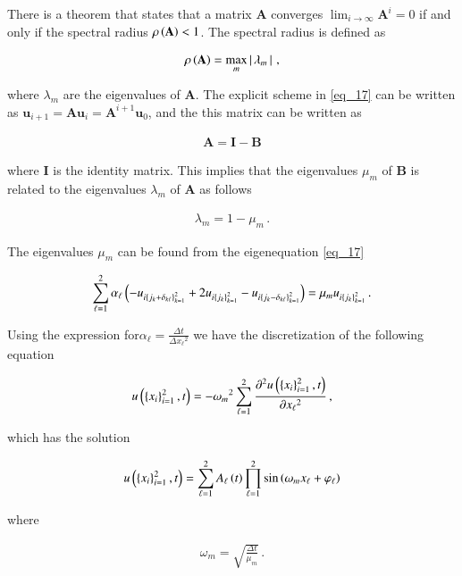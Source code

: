 \documentclass[11pt,english,a4paper]{article}
\begin{document}
\begin{flushleft}
There is a theorem that states that a matrix $\textbf{A}$ converges $\lim_{i\to\infty} \textbf{A}^i = 0$ if and only if the spectral radius $\rho\left({\textbf{A}}\right) < 1$. The spectral radius is defined as

\begin{align*}
\rho\left({\textbf{A}}\right) = \max_m \left\vert{\,\lambda_m\,}\right\vert \,,
\end{align*}

where $\lambda_m$ are the eigenvalues of $\textbf{A}$. The explicit scheme in \eqref{eq_17}  can be written as $\textbf{u}_{i+1} = \textbf{A}\textbf{u}_i = \textbf{A}^{i+1}\textbf{u}_0$, and the this matrix can be written as

\begin{align*}
\textbf{A} = \textbf{I} - \textbf{B}
\end{align*}

where $\textbf{I}$ is the identity matrix. This implies that the eigenvalues $\mu_m$ of $\textbf{B}$ is related to the eigenvalues $\lambda_m$ of $\textbf{A}$ as follows

\begin{align}
\lambda_m = 1 - \mu_m\,.
\label{eq_18}
\end{align}

The eigenvalues $\mu_m$ can be found from the eigenequation \eqref{eq_17}

\begin{align}
\sum_{\ell=1}^2\alpha_\ell\left({-u_{i\left\lbrace{j_k + \delta_{k\ell}}\right\rbrace_{k=1}^2} + 2 u_{i\left\lbrace{j_k}\right\rbrace_{k=1}^2}-u_{i\left\lbrace{j_k - \delta_{k\ell}}\right\rbrace_{k=1}^2}}\right) = \mu_m u_{i\left\lbrace{j_k}\right\rbrace_{k=1}^2} \,.
\label{eq_19}
\end{align}

Using the expression for$\alpha_\ell = \frac{\Delta t}{\Delta {x_\ell}^2}$ we have the discretization of the following equation

\begin{align*}
u\left({\left\lbrace{x_i}\right\rbrace_{i=1}^2,t}\right) = -{\omega_{m}}^2 \sum_{\ell=1}^2 \frac{\partial^2 u\left({\left\lbrace{x_i}\right\rbrace_{i=1}^2,t}\right)}{\partial {x_\ell}^2}\,,
\end{align*}

which has the solution 

\begin{align*}
u\left({\left\lbrace{x_i}\right\rbrace_{i=1}^2, t}\right) = \sum_{\ell=1}^2 A_\ell\left({t}\right) \prod_{\ell=1}^2 \sin\left({\omega_{m} x_\ell + \varphi_\ell}\right)
\end{align*}

where 

\begin{align*}
\omega_{m} = \sqrt{\frac{\Delta t}{\mu_m}}\,.
\end{align*}


\end{flushleft}
\end{document}
